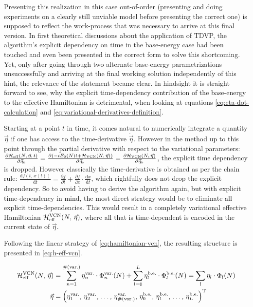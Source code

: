 Presenting this realization in this case out-of-order (presenting and doing experiments on a clearly still unviable model before presenting the correct one) is supposed to reflect the work-process that was necessary to arrive at this final version.
In first theoretical discussions about the application of TDVP, the algorithm's explicit dependency on time in the base-energy case had been touched and even been presented in the correct form to solve this shortcoming.
Yet, only after going through two alternate base-energy parametrizations unsuccessfully and arriving at the final working solution independently of this hint, the relevance of the statement became clear.
In hindsight it is straight forward to see, why the explicit time-dependency contribution of the base-energy to the effective Hamiltonian is detrimental, when looking at equations \ref{eq:eta-dot-calculation} and \ref{eq:variational-derivatives-definition}.

Starting at a point $t$ in time, it comes natural to numerically integrate a quantity $\vec{\eta}$ if one has access to the time-derivative $\dot{\vec{\eta}}$.
However in the method up to this point through the partial derivative with respect to the variational parameters: $\frac{\partial \HeffOft[N,\,\vec{\eta}]}{\partial \vec{\eta}_k} = \frac{\partial \left(-i E_0(N) t + \Hvcn{\vec{\eta}}\right)}{\partial \vec{\eta}_k} = \frac{\partial \Hvcn{\vec{\eta}} }{\partial \vec{\eta}_k}$, the explicit time dependency is dropped.
However classically the time-derivative is obtained as per the chain rule:
$\frac{\mathrm{d} f(t,\,x(t))}{\mathrm{d} t} = \frac{\partial f}{\partial t} + \frac{\partial f}{\partial x} \cdot \frac{\mathrm{d} x}{\mathrm{d} t}$, which rightfully does not drop the explicit dependency.
So to avoid having to derive the algorithm again, but with explicit time-dependency in mind, the most direct strategy would be to eliminate all explicit time-dependencies.
This would result in a completely variational effective Hamiltonian ${\mathcal{H}_\text{eff}^\text{VCN}}({N},\,\vec{\eta})$, where all that is time-dependent is encoded in the current state of $\vec{\eta}$.

Following the linear strategy of \autoref{eq:hamiltonian-vcn}, the resulting structure is presented in \autoref{eq:h-eff-vcn}.

\begin{equation}
    \label{eq:h-eff-vcn}
    \begin{split}
        \Heffvcn{N}{\vec{\eta}} &= \sum\limits_{n=1}^{\text{\#}(\text{var.})} \eta^\text{var.}_{n} \cdot \Phi^\text{var.}_{n}(N)
        + \sum\limits_{l=0}^{L} \eta^\text{b.e.}_{l} \cdot \Phi^\text{b.e.}_{l}(N)
         = \lsum[l] \eta_l \cdot \Phi_l(N)\\
         \vec{\eta} &= \left(
            \eta^\text{var.}_{1},\,\eta^\text{var.}_{2},\, \dots,\, \eta^\text{var.}_{\text{\#}(\text{var.})},\,
            \eta^\text{b.e.}_{0},\,\eta^\text{b.e.}_{1},\, \dots,\, \eta^\text{b.e.}_{L}
           \right)^\text{T}
    \end{split}
\end{equation}

